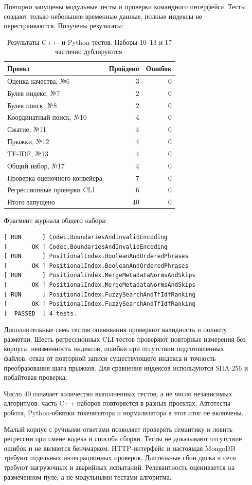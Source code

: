 \results
Повторно запущены модульные тесты и проверки командного интерфейса.
Тесты создают только небольшие временные данные, полные индексы
не перестраиваются. Получены результаты:
\begin{table}[H]\centering
\begin{tabular}{lrr}\toprule
Проект & Пройдено & Ошибок\\\midrule
Оценка качества, №6 & 3 & 0\\
Булев индекс, №7 & 2 & 0\\
Булев поиск, №8 & 2 & 0\\
Координатный поиск, №10 & 4 & 0\\
Сжатие, №11 & 4 & 0\\
Прыжки, №12 & 4 & 0\\
TF-IDF, №13 & 4 & 0\\
Общий набор, №17 & 4 & 0\\
Проверка оценочного конвейера & 7 & 0\\
Регрессионные проверки CLI & 6 & 0\\\midrule
Итого запущено & 40 & 0\\\bottomrule
\end{tabular}
\caption{Результаты C++- и Python-тестов. Наборы 10--13 и 17 частично дублируются.}
\end{table}
Фрагмент журнала общего набора:
\begin{lstlisting}
[ RUN      ] Codec.BoundariesAndInvalidEncoding
[       OK ] Codec.BoundariesAndInvalidEncoding
[ RUN      ] PositionalIndex.BooleanAndOrderedPhrases
[       OK ] PositionalIndex.BooleanAndOrderedPhrases
[ RUN      ] PositionalIndex.MergeMetadataNormsAndSkips
[       OK ] PositionalIndex.MergeMetadataNormsAndSkips
[ RUN      ] PositionalIndex.FuzzySearchAndTfIdfRanking
[       OK ] PositionalIndex.FuzzySearchAndTfIdfRanking
[  PASSED  ] 4 tests.
\end{lstlisting}
Дополнительные семь тестов оценивания проверяют валидность
и полноту разметки. Шесть регрессионных CLI-тестов проверяют
повторные измерения без корпуса, неизменность индексов,
ошибки при отсутствии подготовленных файлов, отказ от повторной
записи существующего индекса и точность преобразования шага прыжков.
Для сравнения индексов используются SHA-256 и побайтовая проверка.

Число 40 означает количество выполненных тестов, а не число
независимых алгоритмов: часть C++-наборов повторяется в разных проектах.
Автотесты робота, Python-обвязки токенизатора и нормализатора
в этот итог не включены.

\conclusions
Малый корпус с ручными ответами позволяет проверять семантику
и ловить регрессии при смене кодека и способа сборки. Тесты
не доказывают отсутствие ошибок и не являются бенчмарком.
HTTP-интерфейс и настоящая MongoDB требуют отдельных интеграционных
проверок. Длительные сбои диска и сети требуют нагрузочных и аварийных
испытаний. Релевантность оценивается на размеченном пуле, а не
модульными тестами алгоритма.
